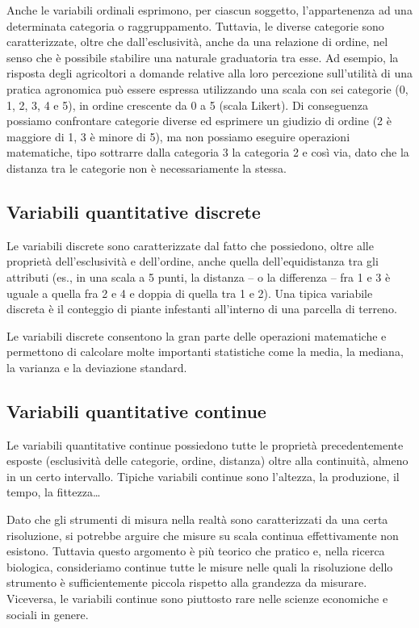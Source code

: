 \documentclass[a4paper,12pt,oneside]{book}
\begin{document}
Anche le variabili ordinali esprimono, per ciascun soggetto, l'appartenenza ad una determinata categoria o raggruppamento. Tuttavia, le diverse categorie sono caratterizzate, oltre che dall'esclusività, anche da una relazione di ordine, nel senso che è possibile stabilire una naturale graduatoria tra esse. Ad esempio, la risposta degli agricoltori a domande relative alla loro percezione sull'utilità di una pratica agronomica può essere espressa utilizzando una scala con sei categorie (0, 1, 2, 3, 4 e 5), in ordine crescente da 0 a 5 (scala Likert). Di conseguenza possiamo confrontare categorie diverse ed esprimere un giudizio di ordine (2 è maggiore di 1, 3 è minore di 5), ma non possiamo eseguire operazioni matematiche, tipo sottrarre dalla categoria 3 la categoria 2 e così via, dato che la distanza tra le categorie non è necessariamente la stessa.

\hypertarget{variabili-quantitative-discrete}{%
\subsection{Variabili quantitative discrete}\label{variabili-quantitative-discrete}}

Le variabili discrete sono caratterizzate dal fatto che possiedono, oltre alle proprietà dell'esclusività e dell'ordine, anche quella dell'equidistanza tra gli attributi (es., in una scala a 5 punti, la distanza -- o la differenza -- fra 1 e 3 è uguale a quella fra 2 e 4 e doppia di quella tra 1 e 2). Una tipica variabile discreta è il conteggio di piante infestanti all'interno di una parcella di terreno.

Le variabili discrete consentono la gran parte delle operazioni matematiche e permettono di calcolare molte importanti statistiche come la media, la mediana, la varianza e la deviazione standard.

\hypertarget{variabili-quantitative-continue}{%
\subsection{Variabili quantitative continue}\label{variabili-quantitative-continue}}

Le variabili quantitative continue possiedono tutte le proprietà precedentemente esposte (esclusività delle categorie, ordine, distanza) oltre alla continuità, almeno in un certo intervallo. Tipiche variabili continue sono l'altezza, la produzione, il tempo, la fittezza\ldots{}

Dato che gli strumenti di misura nella realtà sono caratterizzati da una certa risoluzione, si potrebbe arguire che misure su scala continua effettivamente non esistono. Tuttavia questo argomento è più teorico che pratico e, nella ricerca biologica, consideriamo continue tutte le misure nelle quali la risoluzione dello strumento è sufficientemente piccola rispetto alla grandezza da misurare. Viceversa, le variabili continue sono piuttosto rare nelle scienze economiche e sociali in genere.
\end{document}
